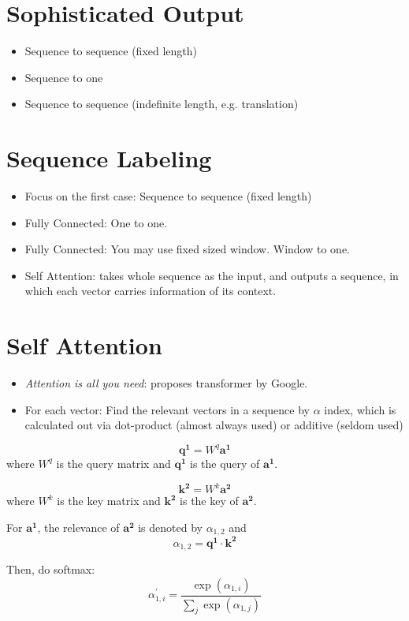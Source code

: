 \documentclass[11pt]{book}
\begin{document}
\section{Sophisticated Output}
\begin{itemize}
    \item Sequence to sequence (fixed length)
    \item Sequence to one
    \item Sequence to sequence (indefinite length, e.g. translation)
\end{itemize}
\section{Sequence Labeling}
\begin{itemize}
    \item Focus on the first case: Sequence to sequence (fixed length)
    \item Fully Connected: One to one.
    \item Fully Connected: You may use fixed sized window. Window to one.
    \item Self Attention: takes whole sequence as the input, and outputs a sequence, in which each vector carries information of its context.
\end{itemize}
\section{Self Attention}
\begin{itemize}
    \item \textit{Attention is all you need}: proposes transformer by Google.
    \item For each vector: Find the relevant vectors in a sequence by $\alpha$ index, which is calculated out via dot-product (almost always used) or additive (seldom used)
\end{itemize}

\begin{displaymath}
    \bm{q^1}=W^q\bm{a^1}
\end{displaymath}
where $W^q$ is the query matrix and $\bm{q^1}$ is the query of $\bm{a^1}$.

\[\bm{k^2}=W^k\bm{a^2}\]
where $W^k$ is the key matrix and $\bm{k^2}$ is the key of $\bm{a^2}$.

For $\bm{a^1}$, the relevance of $\bm{a^2}$ is denoted by $\alpha_{1,2}$ and \[\alpha_{1,2}=\bm{q^1}\cdot\bm{k^2}\]

Then, do softmax: \[\alpha_{1,i}^{\prime}=\frac{\exp(\alpha_{1,i})}{\sum_j\exp(\alpha_{1,j})}\]
\end{document}
